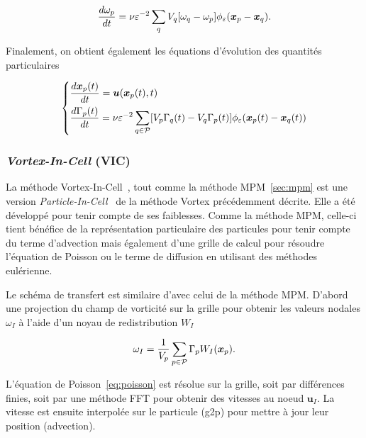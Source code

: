 \begin{equation*}
    \frac{d \omega_p}{dt} = \nu \varepsilon^{-2} \sum_q V_q [\omega_q - \omega_p] \phi_\varepsilon(\bm{x}_p - \bm{x}_q).
\end{equation*}

Finalement, on obtient également les équations d'évolution des quantités particulaires

\begin{gather*}
    \left\{\begin{aligned}
         & \frac{d \bm{x}_p(t)}{dt} = \bm u(\bm{x}_p(t), t)                                                                                                       \\
         & \frac{d\Gamma_p(t)}{dt} = \nu \varepsilon^{-2} \sum_{q \in \mathcal P} [V_p \Gamma_q(t) - V_q \Gamma_p(t)] \phi_\varepsilon(\bm{x}_p(t) - \bm{x}_q(t))
    \end{aligned}\right.
\end{gather*}

\subsubsection{\textit{Vortex-In-Cell} (VIC)}

La méthode Vortex-In-Cell~\cite{christiansen_1973}, tout comme la méthode MPM~\ref{sec:mpm} est une version \textit{Particle-In-Cell}~\cite{birdsall_1969} de la méthode Vortex précédemment décrite. Elle a été développé pour tenir compte de ses faiblesses. Comme la méthode MPM, celle-ci tient bénéfice de la représentation particulaire des particules pour tenir compte du terme d'advection mais également d'une grille de calcul pour résoudre l'équation de Poisson ou le terme de diffusion en utilisant des méthodes eulérienne.

Le schéma de transfert est similaire d'avec celui de la méthode MPM. D'abord une projection du champ de vorticité sur la grille pour obtenir les valeurs nodales $\omega_I$ à l'aide d'un noyau de redistribution $W_I$

\begin{equation*}
    \omega_I = \frac{1}{V_p}\sum_{p \in \mathcal P} \Gamma_p W_I(\bm{x}_p).
\end{equation*}

L'équation de Poisson~\ref{eq:poisson} est résolue sur la grille, soit par différences finies, soit par une méthode FFT pour obtenir des vitesses au noeud $\bm u_I$. La vitesse est ensuite interpolée sur le particule (g2p) pour mettre à jour leur position (advection).

